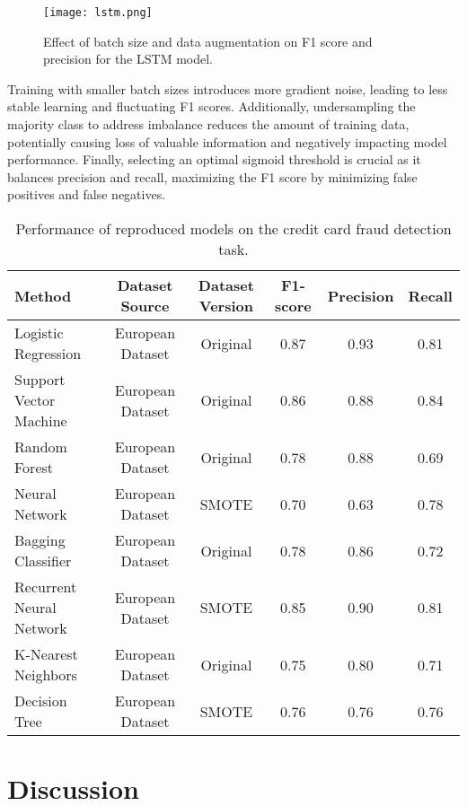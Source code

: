 \documentclass{article}
\begin{document}
\begin{figure}[ht]
    \centering
    \texttt{[image: lstm.png]}
    \caption{Effect of batch size and data augmentation on F1 score and precision for the LSTM model.}
    \label{fig:batch_size_f1}
\end{figure}

Training with smaller batch sizes introduces more gradient noise, leading to less stable learning and fluctuating F1 scores. Additionally, undersampling the majority class to address imbalance reduces the amount of training data, potentially causing loss of valuable information and negatively impacting model performance. Finally, selecting an optimal sigmoid threshold is crucial as it balances precision and recall, maximizing the F1 score by minimizing false positives and false negatives.
  
\begin{table}[h]
    \centering
    \begin{tabular}{lccccc}
        \toprule
        Method & Dataset Source & Dataset Version & F1-score & Precision & Recall \\
        \midrule
        Logistic Regression & European Dataset & Original & 0.87 & 0.93 & 0.81 \\
        Support Vector Machine & European Dataset & Original & 0.86 & 0.88 & 0.84 \\
        Random Forest & European Dataset & Original & 0.78 & 0.88 & 0.69 \\
        Neural Network & European Dataset & SMOTE & 0.70 & 0.63 & 0.78 \\
        Bagging Classifier & European Dataset & Original & 0.78 & 0.86 & 0.72 \\
        Recurrent Neural Network & European Dataset & SMOTE & 0.85 & 0.90 & 0.81 \\
        K-Nearest Neighbors & European Dataset & Original & 0.75 & 0.80 & 0.71 \\
        Decision Tree & European Dataset & SMOTE & 0.76 & 0.76 & 0.76 \\
        \bottomrule
    \end{tabular}
    \caption{Performance of reproduced models on the credit card fraud detection task.}
    \label{tab:results}
\end{table}



\section*{Discussion}
\end{document}
